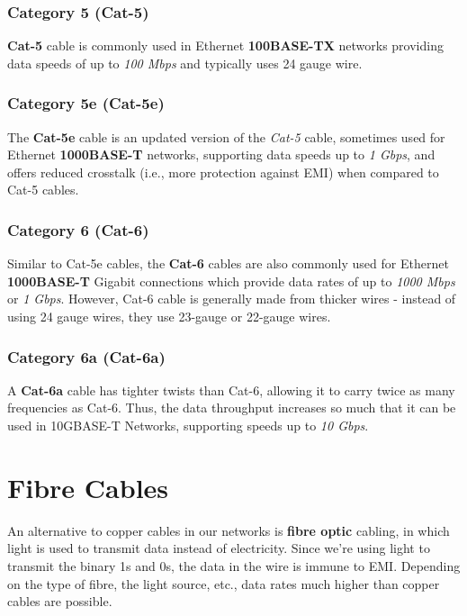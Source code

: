 \subsubsection{Category 5 (Cat-5)}
\vspace{-10pt}
\textbf{Cat-5} cable is commonly used in Ethernet \textbf{100BASE-TX} networks providing data speeds of up to \textit{100 Mbps} and typically uses 24 gauge wire. 

\subsubsection{Category 5e (Cat-5e)}
\vspace{-10pt}
The \textbf{Cat-5e} cable is an updated version of the \textit{Cat-5} cable, sometimes used for Ethernet \textbf{1000BASE-T} networks, supporting data speeds up to \textit{1 Gbps}, and offers reduced crosstalk (i.e., more protection against EMI) when compared to Cat-5 cables. 

\subsubsection{Category 6 (Cat-6)}
\vspace{-10pt}
Similar to Cat-5e cables, the \textbf{Cat-6} cables are also commonly used for Ethernet \textbf{1000BASE-T} Gigabit connections which provide data rates of up to \textit{1000 Mbps} or \textit{1 Gbps}. However, Cat-6 cable is generally made from thicker wires - instead of using 24 gauge wires, they use 23-gauge or 22-gauge wires. 

\subsubsection{Category 6a (Cat-6a)}
\vspace{-10pt}
A \textbf{Cat-6a} cable has tighter twists than Cat-6, allowing it to carry twice as many frequencies as Cat-6. Thus, the data throughput increases so much that it can be used in 10GBASE-T Networks, supporting speeds up to \textit{10 Gbps}. 

\section{Fibre Cables}
An alternative to copper cables in our networks is \textbf{fibre optic} cabling, in which light is used to transmit data instead of electricity. Since we're using light to transmit the binary 1s and 0s, the data in the wire is immune to EMI. Depending on the type of fibre, the light source, etc., data rates much higher than copper cables are possible. 

